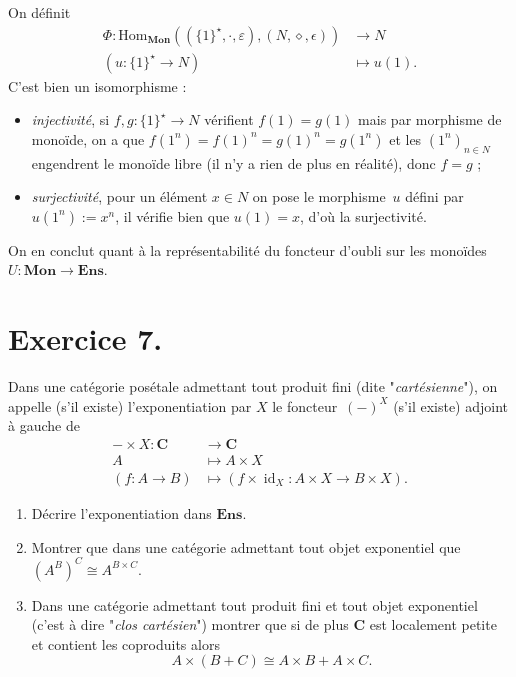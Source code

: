\documentclass{../../td}
\newcommand\id{\ensuremath{\operatorname{id}}}
\begin{document}
\begin{enumerate}
      On définit
      \begin{align*}
        \Phi: \mathrm{Hom}_{\mathbf{Mon}}((\{1\}^\star, \cdot, \varepsilon), (N, \diamond, \epsilon)) &\longrightarrow N \\
        (u : \{1\}^\star \to N) &\longmapsto u(1)
      .\end{align*}
      C'est bien un isomorphisme :
      \begin{itemize}
        \item \textit{injectivité}, si $f, g : \{1\}^\star \to N$ vérifient $f(1) = g(1)$ mais par morphisme de monoïde, on a que $f(1^n) = f(1)^n = g(1)^n = g(1^n)$ et les  $(1^n)_{n \in N}$ engendrent le monoïde libre (il n'y a rien de plus en réalité), donc $f = g$ ;
        \item \textit{surjectivité}, pour un élément $x \in N$ on pose le morphisme~$u$ défini par $u(1^n) := x^n$, il vérifie bien que $u(1) = x$, d'où la surjectivité.
      \end{itemize}

      On en conclut quant à la représentabilité du foncteur d'oubli sur les monoïdes $U : \mathbf{Mon} \to \mathbf{Ens}$.
  \end{enumerate}

  \chapter{Exercice 7.}

  \begin{slshape}
    \color{deepblue}

    Dans une catégorie posétale admettant tout produit fini (dite "\textit{cartésienne}"), on appelle (s'il existe) l'exponentiation par $X$ le foncteur~$(-)^{X}$ (s'il existe) adjoint à gauche de
    \begin{align*}
      - \times X: \mathbf{C} &\longrightarrow \mathbf{C} \\
      A &\longmapsto A \times X\\
      (f : A \to B) &\longmapsto (f \times \id_X : A \times X \to B \times X)
    .\end{align*}

    \begin{enumerate}
      \item Décrire l'exponentiation dans $\mathbf{Ens}$.
      \item Montrer que dans une catégorie admettant tout objet exponentiel que $(A^B)^C \cong A^{B \times C}$.
      \item Dans une catégorie admettant tout produit fini et tout objet exponentiel (c'est à dire "\textit{clos cartésien}") montrer que si de plus $\mathbf{C}$ est localement petite et contient les coproduits alors \[
      A \times (B + C) \cong A \times B + A \times C
      .\]
    \end{enumerate}
  \end{slshape}
\end{document}
